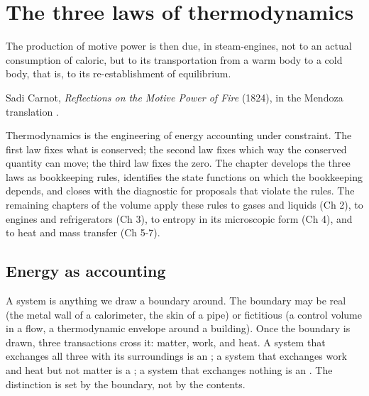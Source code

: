 \chapter{The three laws of thermodynamics}
\label{vol04:ch01}

\epigraph{The production of motive power is then due, in steam-engines,
not to an actual consumption of caloric, but to its transportation from
a warm body to a cold body, that is, to its re-establishment of
equilibrium.}{Sadi Carnot, \emph{Reflections on the Motive Power of
Fire} (1824), in the Mendoza translation \cite[p.~7]{hist:carnot1824}.}


\noindent
Thermodynamics is the engineering of energy accounting under
constraint. The first law fixes what is conserved; the second law fixes
which way the conserved quantity can move; the third law fixes the
zero. The chapter develops the three laws as bookkeeping rules,
identifies the state functions on which the bookkeeping depends, and
closes with the diagnostic for proposals that violate the rules. The
remaining chapters of the volume apply these rules to gases and
liquids (Ch 2), to engines and refrigerators (Ch 3), to entropy in its
microscopic form (Ch 4), and to heat and mass transfer (Ch 5-7).

\section{Energy as accounting}

A system is anything we draw a boundary around. The boundary may be
real (the metal wall of a calorimeter, the skin of a pipe) or
fictitious (a control volume in a flow, a thermodynamic envelope
around a building). Once the boundary is drawn, three transactions
cross it: matter, work, and heat. A system that exchanges all three
with its surroundings is an ; a system that
exchanges work and heat but not matter is a ; a
system that exchanges nothing is an . The
distinction is set by the boundary, not by the contents.

